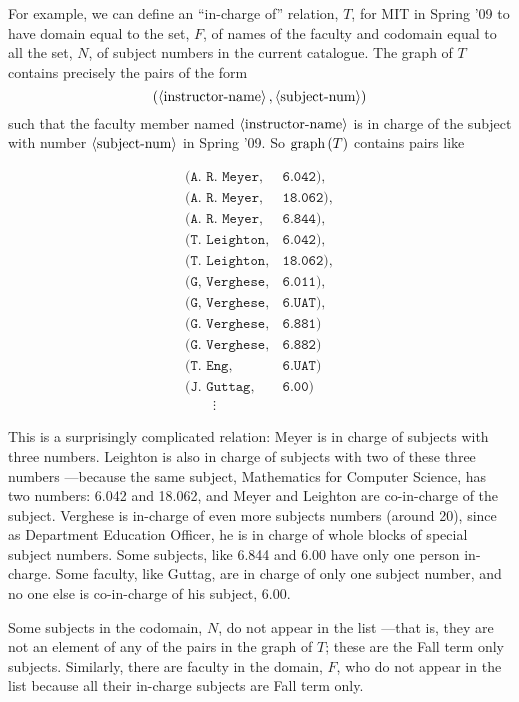 For example, we can define an ``in-charge of'' relation, $T$, for MIT in
Spring '09 to have domain equal to the set, $F$, of names of the faculty
and codomain equal to all the set, $N$, of subject numbers in the current
catalogue.  The graph of $T$ contains precisely the pairs of the form
\[
(\left\langle\text{instructor-name}\right\rangle, \left\langle\text{subject-num}\right\rangle)
\]
such that the faculty member named $\left\langle\text{instructor-name}\right\rangle$ is
in charge of the subject with number $\left\langle\text{subject-num}\right\rangle$ in Spring '09.
So $\mathop{\textup{graph}}\nolimits\left(T\right)$ contains pairs like

\[\begin{array}{ll}
(\texttt{A. R. Meyer}, & \texttt{6.042}),\\
(\texttt{A. R. Meyer}, & \texttt{18.062}),\\
(\texttt{A. R. Meyer}, & \texttt{6.844}),\\
(\texttt{T. Leighton}, & \texttt{6.042}),\\
(\texttt{T. Leighton}, & \texttt{18.062}),\\
(\texttt{G, Verghese}, & \texttt{6.011}),\\
(\texttt{G, Verghese}, & \texttt{6.UAT}),\\
(\texttt{G. Verghese}, & \texttt{6.881})\\
(\texttt{G. Verghese}, & \texttt{6.882})\\
(\texttt{T. Eng},      & \texttt{6.UAT})\\
(\texttt{J. Guttag},  & \texttt{6.00})\\
\qquad \vdots
\end{array}\]

This is a surprisingly complicated relation: Meyer is in charge of
subjects with three numbers.  Leighton is also in charge of subjects with
two of these three numbers ---because the same subject, Mathematics for
Computer Science, has two numbers: 6.042 and 18.062, and Meyer and
Leighton are co-in-charge of the subject.  Verghese is in-charge of even
more subjects numbers (around 20), since as Department Education Officer,
he is in charge of whole blocks of special subject numbers.  Some
subjects, like 6.844 and 6.00 have only one person in-charge.  Some
faculty, like Guttag, are in charge of only one subject number, and no
one else is co-in-charge of his subject, 6.00.

Some subjects in the codomain, $N$, do not appear in the list ---that is,
they are not an element of any of the pairs in the graph of $T$; these are
the Fall term only subjects.  Similarly, there are faculty in the domain,
$F$, who do not appear in the list because all their in-charge subjects
are Fall term only.

